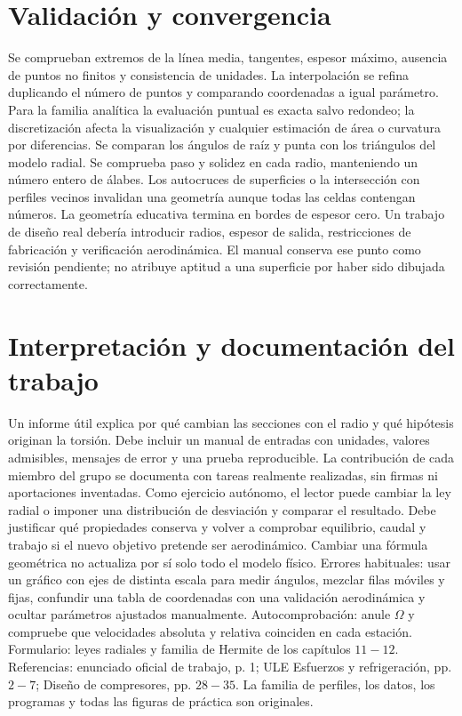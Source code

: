 \documentclass[10pt,openany]{book}
\begin{document}
\section{Validación y convergencia}

Se comprueban extremos de la línea media, tangentes, espesor máximo, ausencia de puntos no finitos y consistencia de unidades. La interpolación se refina duplicando el número de puntos y comparando coordenadas a igual parámetro. Para la familia analítica la evaluación puntual es exacta salvo redondeo; la discretización afecta la visualización y cualquier estimación de área o curvatura por diferencias.
Se comparan los ángulos de raíz y punta con los triángulos del modelo radial. Se comprueba paso y solidez en cada radio, manteniendo un número entero de álabes. Los autocruces de superficies o la intersección con perfiles vecinos invalidan una geometría aunque todas las celdas contengan números.
La geometría educativa termina en bordes de espesor cero. Un trabajo de diseño real debería introducir radios, espesor de salida, restricciones de fabricación y verificación aerodinámica. El manual conserva ese punto como revisión pendiente; no atribuye aptitud a una superficie por haber sido dibujada correctamente.

\section{Interpretación y documentación del trabajo}

Un informe útil explica por qué cambian las secciones con el radio y qué hipótesis originan la torsión. Debe incluir un manual de entradas con unidades, valores admisibles, mensajes de error y una prueba reproducible. La contribución de cada miembro del grupo se documenta con tareas realmente realizadas, sin firmas ni aportaciones inventadas.
Como ejercicio autónomo, el lector puede cambiar la ley radial o imponer una distribución de desviación y comparar el resultado. Debe justificar qué propiedades conserva y volver a comprobar equilibrio, caudal y trabajo si el nuevo objetivo pretende ser aerodinámico. Cambiar una fórmula geométrica no actualiza por sí solo todo el modelo físico.
Errores habituales: usar un gráfico con ejes de distinta escala para medir ángulos, mezclar filas móviles y fijas, confundir una tabla de coordenadas con una validación aerodinámica y ocultar parámetros ajustados manualmente. Autocomprobación: anule \(\Omega\) y compruebe que velocidades absoluta y relativa coinciden en cada estación.
Formulario: leyes radiales y familia de Hermite de los capítulos \(11-12\). Referencias: enunciado oficial de trabajo, p. 1; ULE Esfuerzos y refrigeración, pp. \(2-7\); Diseño de compresores, pp. \(28-35\). La familia de perfiles, los datos, los programas y todas las figuras de práctica son originales.
\end{document}
